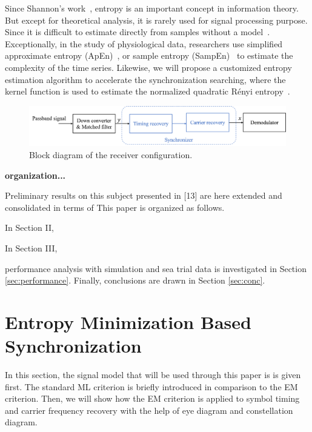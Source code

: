 \documentclass[journal,comsoc]{IEEEtran}
\begin{document}
Since Shannon's work~\cite{Shannon1948}, entropy is an important concept in information theory. 
But except for theoretical analysis, it is rarely used for signal processing purpose.
Since it is difficult to estimate directly from samples without a model~\cite{Bercher2000,Santamaria2002}.
Exceptionally, in the study of physiological data, researchers use simplified approximate entropy (ApEn)~\cite{Pincus1991}, or sample entropy (SampEn)~\cite{Richman2000} to estimate the complexity of the time series.
Likewise, we will propose a customized entropy estimation algorithm to accelerate the synchronization searching,
where the kernel function is used to estimate the normalized quadratic R\'enyi entropy~\cite{Santamaria2002,Huang2008}.


\begin{figure}[ht]
\centering
\includegraphics[width=5.5 in]{pic/sys_conf.png}
\caption{Block diagram of the receiver configuration.}
\label{fig:sysconf} 
\end{figure}

\textbf{organization...}

Preliminary results on this subject presented in [13] are here extended and consolidated in terms of
This paper is organized as follows.

In Section II,

In Section III,

performance analysis with simulation and sea trial data is investigated in Section \ref{sec:performance}. 
Finally, conclusions are drawn in Section \ref{sec:conc}.

\section{Entropy Minimization Based Synchronization}
\label{sec:entropy}
In this section, the signal model that will be used through this paper is is given first.
The standard ML criterion is briefly introduced in comparison to the EM criterion.
Then, we will show  how the EM criterion is applied to symbol timing and carrier frequency recovery with the help of eye diagram and constellation diagram.
\end{document}
